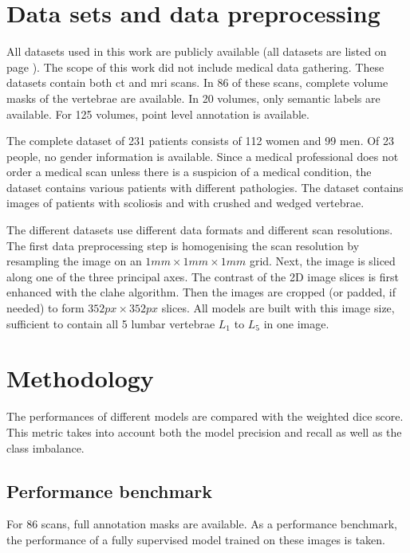 \begin{multicols}{2}
\section*{Data sets and data preprocessing \label{sec:abstr_data}}
\par{
    All datasets used in this work are publicly available (all datasets are listed on page \pageref{sec:datasets}). 
    The scope of this work did not include medical data gathering.
    These datasets contain both \acrshort{ct} and \acrshort{mri} scans. 
    In 86 of these scans, complete volume masks of the vertebrae are available. 
    In 20 volumes, only semantic labels are available.
    For 125 volumes, point level annotation is available.
}
\par{
    The complete dataset of 231 patients consists of 112 women and 99 men. Of 23 people, no gender information is available. 
    Since a medical professional does not order a medical scan unless there is a suspicion of a medical condition, the dataset contains various patients with different pathologies.
    The dataset contains images of patients with scoliosis and with crushed and wedged vertebrae.
}
\par{
    The different datasets use different data formats and different scan resolutions. 
    The first data preprocessing step is homogenising the scan resolution by resampling the image on an $1mm\times 1mm\times 1mm$ grid. 
    Next, the image is sliced along one of the three principal axes.
    The contrast of the 2D image slices is first enhanced with the \acrfull{clahe} algorithm.
    Then the images are cropped (or padded, if needed) to form $352 px \times 352 px$ slices.
    All models are built with this image size, sufficient to contain all 5 lumbar vertebrae $L_1$ to $L_5$ in one image.
}


\section*{Methodology}
\par{
    The performances of different models are compared with the weighted dice score.
    This metric takes into account both the model precision and recall as well as the class imbalance.
}


\subsection*{Performance benchmark}
\par{
    For 86 scans, full annotation masks are available.
    As a performance benchmark, the performance of a fully supervised model trained on these images is taken.
}




\end{multicols}
